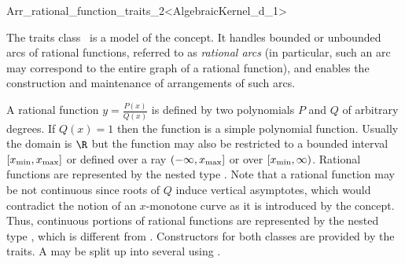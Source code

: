 
\ccRefPageBegin
\begin{ccRefClass}{Arr_rational_function_traits_2<AlgebraicKernel_d_1>}

\ccDefinition

The traits class \ccRefName\ is a model of the 
concept. It handles bounded or unbounded arcs of rational functions,
referred to as {\sl rational arcs} (in particular, such an arc may
correspond to the entire graph of a rational function), and enables the
construction and maintenance of arrangements of such arcs. 

A rational function $y = \frac{P(x)}{Q(x)}$ is defined by two polynomials 
$P$ and $Q$ of arbitrary degrees. 
If $Q(x) = 1$ then the function is a simple polynomial function.
Usually the domain is $\R$ but the function may also be 
restricted to a bounded interval $[x_{\rm min}, x_{\rm max}]$ 
or defined over a ray $(-\infty, x_{\rm max}]$ or over $[x_{\rm min}, \infty)$. 
Rational functions are represented by the nested type . 
Note that a rational function may be not continuous since roots of $Q$ induce 
vertical asymptotes, which would contradict the notion of an $x$-monotone curve as 
it is introduced by the  concept. 
Thus, continuous portions of rational functions are represented by the nested 
type , which is different from .
Constructors for both classes are provided by the traits. 
A  may be split up into several 
using . 



\end{ccRefClass}
